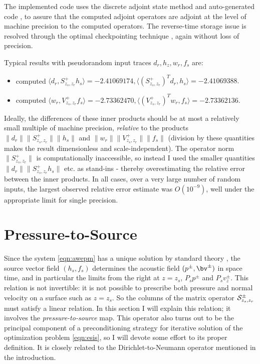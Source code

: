 The implemented code uses the discrete adjoint state method and auto-generated code \cite[]{TapenadeRef13}, to
assure that the computed adjoint operators are adjoint at the level of
machine precision to the computed operators. The reverse-time storage
issue is resolved through the optimal checkpointing technique
\cite[]{Griewank:book,Symes:06a-pub}, again without loss of precision.

Typical results with pseudorandom input traces $d_r, h_z, w_r, f_s$ are:
\begin{itemize}
\item computed $\langle d_r, S^+_{z_s,z_r}h_s\rangle = -2.41069174,
  \langle (S^+_{z_s,z_r})^Td_r, h_s \rangle = -2.41069388.$
\item  computed $\langle w_r, V^+_{z_s,z_r}f_s\rangle = -2.73362470,
  \langle (V^+_{z_s,z_r})^Tw_r, f_s \rangle = -2.73362136.$
\end{itemize}
Ideally, the differences of these inner products should be at most a
relatively small multiple of machine precision, {\em relative} to the
products $\|d_r\|\| S^+_{z_s,z_r}\|\|h_s\|$ and
$\|w_r\|\|V^+_{z_s,z_r}\|\|f_s\|$ (division by these quantities makes the result
dimensionless and scale-independent). The operator norm $\| S^+_{z_s,z_r}\|$ is
computationally inaccessible, so instead I used the smaller quantities
$\|d_r\|\| S^+_{z_s,z_r}h_s\|$ etc. as stand-ins - thereby
overestimating the relative error between the inner products. In all
cases, over a very large number of random inputs, the largest observed
relative error estimate was $O(10^{-9})$, well under the appropriate limit for
single precision.

\section{Pressure-to-Source}

Since the system \ref{eqn:awepm} has a unique solution by standard
theory \cite[]{Lax:PDENotes}, the source vector field $(h_s,f_s)$
determines the acoustic field $(p^{\pm},\bv^{\pm})$ in space time, and
in particular the limits from the right at $z=z_s$, $P_sp^{\pm}$ and
$P_sv_z^{\pm}$. This relation is not invertible: it is not possible to
prescribe both pressure and normal velocity on a surface such as
$z=z_s$. So the columns of the matrix operator
${\cal S}^{\pm}_{z_s,z_r}$ must satisfy a linear relation. In this
section I will explain this relation; it involves the {\em
  pressure-to-source} map. This operator also turns out to be the
principal component of a preconditioning strategy for iterative
solution of the optimization problem \ref{eqn:esis}, so I will devote
some effort to its proper definition. It is closely related to the
Dirichlet-to-Neumann operator mentioned in the introduction.

